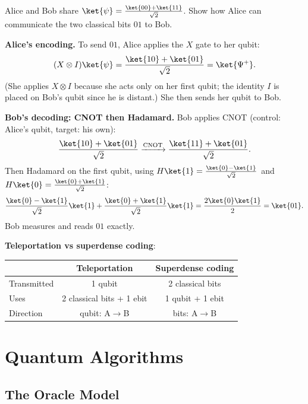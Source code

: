 \documentclass[oneside]{academica}
\begin{document}
\begin{exercise*}
  Alice and Bob share $\ket{\psi}=\tfrac{\ket{00}+\ket{11}}{\sqrt{2}}$.
  Show how Alice can communicate the two classical bits $01$ to Bob.

  \textbf{Alice's encoding.}
  To send $01$, Alice applies the $X$ gate to her qubit:
  \begin{equation*}
    (X\otimes I)\ket{\psi} = \frac{\ket{10}+\ket{01}}{\sqrt{2}} = \ket{\Psi^+}.
  \end{equation*}
  (She applies $X\otimes I$ because she acts only on her first qubit; the identity $I$ is placed on Bob's qubit since he is distant.)
  She then sends her qubit to Bob.

  \textbf{Bob's decoding: CNOT then Hadamard.}
  Bob applies CNOT (control: Alice's qubit, target: his own):
  \begin{equation*}
    \frac{\ket{10}+\ket{01}}{\sqrt{2}} \xrightarrow{\mathrm{CNOT}}
    \frac{\ket{11}+\ket{01}}{\sqrt{2}}.
  \end{equation*}
  Then Hadamard on the first qubit, using
  $H\ket{1}=\tfrac{\ket{0}-\ket{1}}{\sqrt{2}}$ and
  $H\ket{0}=\tfrac{\ket{0}+\ket{1}}{\sqrt{2}}$:
  \begin{equation*}
    \frac{\ket{0}-\ket{1}}{\sqrt{2}}\ket{1}
    +\frac{\ket{0}+\ket{1}}{\sqrt{2}}\ket{1}
    = \frac{2\ket{0}\ket{1}}{2} = \ket{01}.
  \end{equation*}
  Bob measures and reads $01$ exactly.
\end{exercise*}

\textbf{Teleportation vs superdense coding}:
\begin{center}
  \renewcommand{\arraystretch}{1.3}
  \begin{tabular}{l|c|c}
    & \textbf{Teleportation} & \textbf{Superdense coding} \\
    \hline
    Transmitted & 1 qubit & 2 classical bits \\
    Uses & 2 classical bits + 1 ebit & 1 qubit + 1 ebit \\
    Direction & qubit: A$\to$B & bits: A$\to$B \\
  \end{tabular}
\end{center}

\chapter{Quantum Algorithms}

\section{The Oracle Model}
\end{document}
